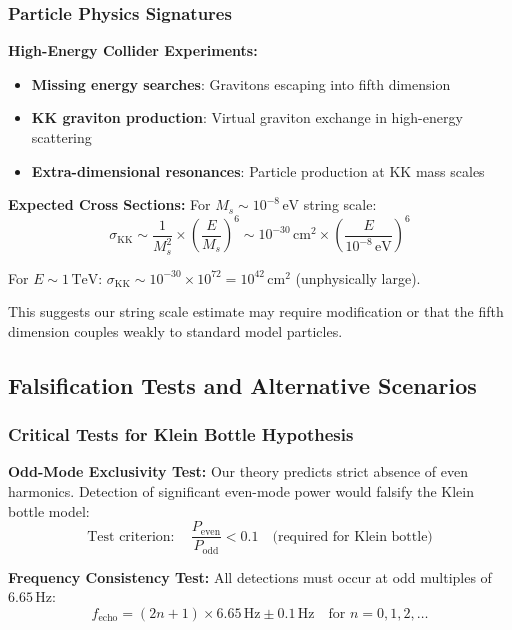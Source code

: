 \documentclass[reprint,amsmath,amssymb,aps,prd]{revtex4-2}
\newcommand{\Hz}{\,\text{Hz}}
\begin{document}
\subsubsection{Particle Physics Signatures}

\textbf{High-Energy Collider Experiments:}
\begin{itemize}
\item \textbf{Missing energy searches}: Gravitons escaping into fifth dimension
\item \textbf{KK graviton production}: Virtual graviton exchange in high-energy scattering
\item \textbf{Extra-dimensional resonances}: Particle production at KK mass scales
\end{itemize}

\textbf{Expected Cross Sections:}
For $M_s \sim 10^{-8}\,\text{eV}$ string scale:
\begin{equation}
\sigma_{\text{KK}} \sim \frac{1}{M_s^2} \times \left(\frac{E}{M_s}\right)^6 \sim 10^{-30}\,\text{cm}^2 \times \left(\frac{E}{10^{-8}\,\text{eV}}\right)^6
\end{equation}

For $E \sim 1\,\text{TeV}$: $\sigma_{\text{KK}} \sim 10^{-30} \times 10^{72} = 10^{42}\,\text{cm}^2$ (unphysically large).

This suggests our string scale estimate may require modification or that the fifth dimension couples weakly to standard model particles.

\subsection{Falsification Tests and Alternative Scenarios}

\subsubsection{Critical Tests for Klein Bottle Hypothesis}

\textbf{Odd-Mode Exclusivity Test:}
Our theory predicts strict absence of even harmonics. Detection of significant even-mode power would falsify the Klein bottle model:
\begin{equation}
\text{Test criterion}: \quad \frac{P_{\text{even}}}{P_{\text{odd}}} < 0.1 \quad \text{(required for Klein bottle)}
\end{equation}

\textbf{Frequency Consistency Test:}
All detections must occur at odd multiples of $6.65\Hz$:
\begin{equation}
f_{\text{echo}} = (2n+1) \times 6.65\Hz \pm 0.1\Hz \quad \text{for } n = 0,1,2,\ldots
\end{equation}
\end{document}
